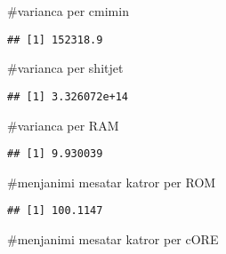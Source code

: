 \documentclass[
]{article}
\newenvironment{Shaded}{\begin{snugshade}}{\end{snugshade}}
\newcommand{\FunctionTok}[1]{\textcolor[rgb]{0.00,0.00,0.00}{#1}}
\newcommand{\NormalTok}[1]{#1}
\newcommand{\SpecialCharTok}[1]{\textcolor[rgb]{0.00,0.00,0.00}{#1}}
\begin{document}
\#varianca per cmimin

\begin{Shaded}
\end{Shaded}

\begin{verbatim}
## [1] 152318.9
\end{verbatim}

\#varianca per shitjet

\begin{Shaded}
\end{Shaded}

\begin{verbatim}
## [1] 3.326072e+14
\end{verbatim}

\#varianca per RAM

\begin{Shaded}
\end{Shaded}

\begin{verbatim}
## [1] 9.930039
\end{verbatim}

\#menjanimi mesatar katror per ROM

\begin{Shaded}
\end{Shaded}

\begin{verbatim}
## [1] 100.1147
\end{verbatim}

\#menjanimi mesatar katror per cORE

\begin{Shaded}
\end{Shaded}
\end{document}
